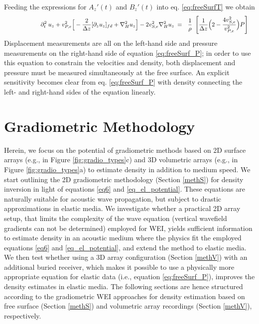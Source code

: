 \documentclass{article}
\begin{document}
	Feeding the expressions for $A_{z}'(t) $ and $B_{z}'(t) $ into eq. \eqref{eq:freeSurfT} we obtain
	\begin{align} \shoveright \shoveright \shoveright \shoveright \shoveright \shoveright 
		\partial_{t}^{2} \: u_{z}  +  v_{P,e}^{2} \Big[ - \frac{2}{\Delta z}  [\partial_{z} u_{z}]_{fd} +  \nabla_{H}^{2}u_{z} \Big] - 2 v_{S,e}^{2} \nabla_{H}^{2}u_{z}  \: &=  \: \: \: \frac{1}{\rho} \: \;  \Bigg[ \frac{1}{\Delta z} \Big( 2 - \frac{4v_{S,e}^{2}}{v_{P,e}^{2}}\Big) P\Bigg]
		\label{eq:freeSurf_P}   
	\end{align}
	Displacement measurements are all on the left-hand side and pressure measurements on the right-hand side of equation \eqref{eq:freeSurf_P}; in order to use this equation to constrain the velocities and density, both displacement and pressure must be measured simultaneously at the free surface. An explicit sensitivity becomes clear from eq. \eqref{eq:freeSurf_P} with density connecting the left- and right-hand sides of the equation linearly.\\
	
	\section{Gradiometric Methodology} \label{meth}
	Herein, we focus on the potential of gradiometric methods based on 2D surface arrays (e.g., \textcite{de2015near} in Figure \ref{fig:gradio_types}c) and 3D volumetric arrays (e.g., \textcite{curtis2002volumetric} in Figure \ref{fig:gradio_types}a)  to estimate density in addition to medium speed. We start outlining the 2D gradiometric methodology (Section \ref{methS}) for density inversion in light of equations \eqref{eq6} and \eqref{eq_el_potential}. These equations are naturally suitable for acoustic wave propagation, but subject to drastic approximations in elastic media. We investigate whether a practical 2D array setup, that limits the complexity of the wave equation (vertical wavefield gradients can not be determined) employed for WEI, yields sufficient information to estimate density in an acoustic medium where the physics fit the employed equations \eqref{eq6} and \eqref{eq_el_potential}, and extend the method to elastic media. We then test whether using a 3D array configuration (Section \ref{methV}) with an additional buried receiver, which makes it possible to use a physically more appropriate equation for elastic data (i.e., equation \ref{eq:freeSurf_P}), improves the density estimates in elastic media. The following sections are hence structured according to the gradiometric WEI approaches for density estimation based on free surface (Section \ref{methS}) and volumetric array recordings (Section \ref{methV}), respectively. 
	
\end{document}
